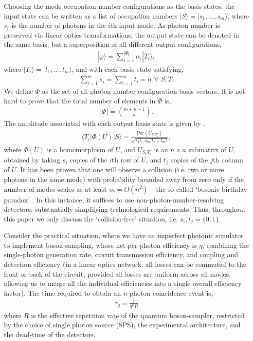 \documentclass[aps,rmp,twocolumn,amsmath,amssymb,nofootinbib,superscriptaddress]{revtex4}
\newcommand{\bra}[1]{\langle#1|}
\newcommand{\ket}[1]{|#1\rangle}
\begin{document}
Choosing the mode occupation-number configurations as the basis states, the input state can be written as a list of occupation numbers \mbox{$\ket{S}=\ket{s_1,\dots,s_m}$}, where $s_i$ is the number of photons in the $i$th input mode. As photon-number is preserved via linear optics transformations, the output state can be denoted in the same basis, but a superposition of all different output configurations,
\begin{align}
\ket\varphi = \sum_{i=1}^{|\Phi|}\alpha_i \ket{T_i},
\end{align}
where \mbox{$\ket{T_i} = \ket{t_1,\dots,t_m}$}, and with each basis state satisfying,
\begin{align}
\sum_{i=1}^m s_i = \sum_{i=1}^m t_i = n \,\,\forall\,\, S,T.
\end{align}
We define $\Phi$ as the set of all photon-number configuration basis vectors. It is not hard to prove that the total number of elements in $\Phi$ is,
\begin{align}
|\Phi|=\binom{m+n-1}{n}.
\end{align}
The amplitude associated with each output basis state is given by \cite{bib:2, bib:12},
\begin{align}
\bra{T_i} \Phi(U) \ket{S} = \frac{\mathrm{Per}(U_{S,T_i})}{\sqrt{s_1!\dots s_m!t_1!\dots t_m!}},
\end{align}
where $\Phi(U)$ is a homomorphism of $U$, and $U_{S,T_i}$ is an $n\times n$ submatrix of $U$, obtained by taking $s_i$ copies of the $i$th row of $U$, and $t_j$ copies of the $j$th column of $U$. It has been proven that \cite{bib:2, bib:13, bib:14} one will observe a collision (i.e. two or more photons in the same mode) with probability bounded away from zero only if the number of modes scales as at least $m=O(n^2)$ -- the so-called `bosonic birthday paradox' \cite{???}. In this instance, it suffices to use non-photon-number-resolving detectors, substantially simplifying technological requirements. Thus, throughout this paper we only discuss the `collision-free' situation, i.e. $s_i,t_j=\{0,1\}$.

Consider the practical situation, where we have an imperfect photonic simulator to implement boson-sampling, whose net per-photon efficiency is $\eta$, combining the single-photon generation rate, circuit transmission efficiency, and coupling and detection efficiency (in a linear optics network, all losses can be commuted to the front or back of the circuit, provided all losses are uniform across all modes, allowing us to merge all the individual efficiencies into a single overall efficiency factor). The time required to obtain an $n$-photon coincidence event is,
\begin{align} \label{eq:tau_q}
\tau_q = \frac{1}{\eta^n R}
\end{align}
where $R$ is the effective repetition rate of the quantum boson-sampler, restricted by the choice of single photon source (SPS), the experimental architecture, and the dead-time of the detectors.
\end{document}
